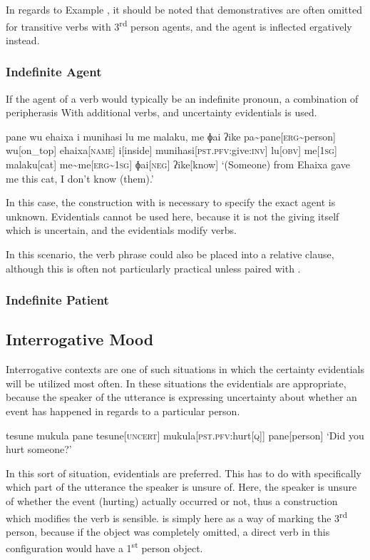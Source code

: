 In regards to Example , it should be noted that demonstratives are often omitted for transitive verbs with 3\textsuperscript{rd} person agents, and the agent is inflected ergatively instead.

\subsubsection{Indefinite Agent}
If the agent of a verb would typically be an indefinite pronoun, a combination of peripherasis With additional verbs, and uncertainty evidentials is used.

\ex
\begingl
\glpreamble pane wu ehaixa i munihasi lu me malaku, me ɸai ʔike
\endpreamble
\nogloss{\lbrack}
pa\textasciitilde pane[\textsc{erg\textasciitilde}person]
wu[on\_top]
ehaixa[\textsc{name}]
i[inside]
munihasi[\textsc{pst.pfv}:give\textsc{:inv}]
lu[\textsc{obv}]
me[\textsc{1sg}]
malaku[cat]
\nogloss{\rbrack}
me\textasciitilde me[\textsc{erg\textasciitilde 1sg}]
ɸai[\textsc{neg}]
ʔike[know]
\glft `(Someone) from Ehaixa gave me this cat, I don't know (them).'
\endgl
\xe

In this case, the construction with  is necessary to specify the exact agent is unknown.
Evidentials cannot be used here, because it is not the giving itself which is uncertain, and the evidentials modify verbs.

In this scenario, the verb phrase could also be placed into a relative clause, although this is often not particularly practical unless paired with .
\subsubsection{Indefinite Patient}
\subsection{Interrogative Mood}
Interrogative contexts are one of such situations in which the certainty evidentials will be utilized most often.
In these situations the evidentials are appropriate, because the speaker of the utterance is expressing uncertainty about whether an event has happened in regards to a particular person.

\ex
\begingl
\glpreamble tesune mukula pane
\endpreamble
tesune[\textsc{uncert}]
mukula[\textsc{pst.pfv:}hurt\textsc{[q]}]
pane[person]
\glft `Did you hurt someone?'
\endgl
\xe

In this sort of situation, evidentials are preferred.
This has to do with specifically which part of the utterance the speaker is unsure of.
Here, the speaker is unsure of whether the event (hurting) actually occurred or not, thus a construction which modifies the verb is sensible.
 is simply here as a way of marking the 3\textsuperscript{rd} person, because if the object was completely omitted, a direct verb in this configuration would have a 1\textsuperscript{st} person object.